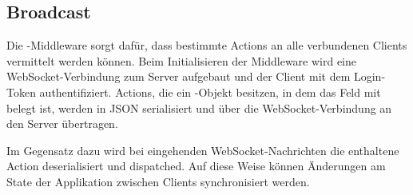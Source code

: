 \subsection{Broadcast}
\label{ssec:fm_broadcast}

Die -Middleware sorgt dafür, dass bestimmte Actions an alle
verbundenen Clients vermittelt werden können.  Beim Initialisieren der
Middleware wird eine WebSocket-Verbindung zum Server aufgebaut und der Client mit
dem Login-Token authentifiziert.  Actions, die ein -Objekt besitzen,
in dem das Feld  mit  belegt ist, werden in JSON
serialisiert und über die WebSocket-Verbindung an den Server übertragen.

Im Gegensatz dazu wird bei eingehenden WebSocket-Nachrichten die enthaltene
Action deserialisiert und dispatched.  Auf diese Weise können Änderungen am
State der Applikation zwischen Clients synchronisiert werden.
